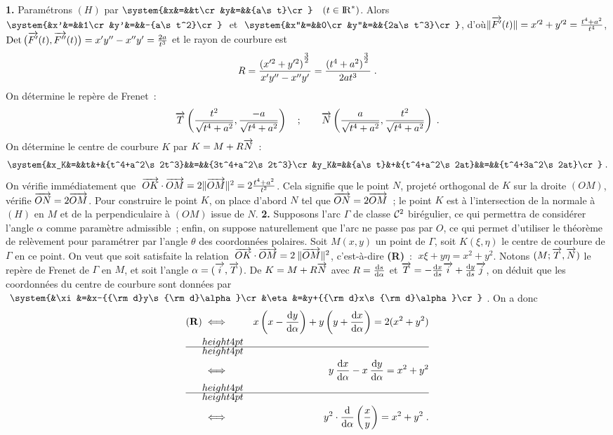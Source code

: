 \documentclass{article}
\begin{document}
{\bf 1.} Param\'etrons $(H)$ par $\system{&x&=&&t\cr &y&=&&{a\s t}\cr}\;$ $\;(t\in{\rm I\kern-0.6mm R}^*)$.
Alors $\system{&x'&=&&1\cr &y'&=&&-{a\s t^2}\cr}\;$ et $\;\system{&x''&=&&0\cr
&y''&=&&{2a\s t^3}\cr}$, d'o\`u\break\noi $\|\vect{F'}(t)\|=x'^2+y'^2={t^4+a^2\s t^4}$,
$\Det\big(\vect{F'}(t),\vect{F''}(t)\big)=x'y''-x''y'={2a\s t^3}$ et le rayon
de courbure est
$$R={(x'^2+y'^2)^{{}^{\sst3\sur\sst2}}\s x'y''-x''y'}={(t^4+a^2)^{{}^{\sst3\sur\sst2}}\s
  2at^3}\;.$$
On d\'etermine le rep\`ere de Frenet~:\vv
$$\vect{T}\lp{t^2\s\sqrt{t^4+a^2}},{-a\s\sqrt{t^4+a^2}}\rp\quad;\qquad
  \vect{N}\lp{a\s\sqrt{t^4+a^2}},{t^2\s\sqrt{t^4+a^2}}\rp\;.$$
On d\'etermine le centre de courbure $K$ par $K=M+R\vect{N}$~:\vv
$$\system{&x_K&=&&t&+&{t^4+a^2\s2t^3}&&=&&{3t^4+a^2\s2t^3}\cr
          &y_K&=&&{a\s t}&+&{t^4+a^2\s2at}&&=&&{t^4+3a^2\s2at}\cr}\;.$$
On v\'erifie imm\'ediatement que $\;\vect{OK}\cdot\vect{OM}=2\|\vect{OM}\|^2=
2{t^4+a^2\s t^2}$. Cela signifie que le point $N$, projet\'e orthogonal de $K$
sur la droite $(OM)$, v\'erifie $\vect{ON}=2\vect{OM}$.\ssk\sect
Pour construire le point $K$, on place d'abord $N$ tel que $\vect{ON}=
2\vect{OM}$~; le point $K$ est \`a l'intersection de la normale \`a $(H)$ en $M$
et de la perpendiculaire \`a $(OM)$ issue de $N$.
\msk
{\bf 2.} Supposons l'arc $\Gamma$ de classe ${\cal C}^2$ bir\'egulier, ce qui permettra de consid\'erer l'angle $\alpha$ comme param\`etre admissible~; enfin, on suppose naturellement que l'arc ne passe pas par $O$, ce qui permet d'utiliser le th\'eor\`eme de rel\`evement pour param\'etrer par l'angle $\theta$ des coordonn\'ees polaires.\msk\sect
Soit $M(x,y)$ un point de $\Gamma$, soit $K(\xi,\eta)$ le centre de courbure de $\Gamma$ en ce point. On veut que soit satisfaite la relation $\;\vect{OK}\cdot\vect{OM}=2\>\|\vect{OM}\|^2$, c'est-\`a-dire {\bf (R)}~: $\;x\xi+y\eta=x^2+y^2$.\msk\sect
Notons $(M;\vect{T},\vect{N})$ le rep\`ere de Frenet de $\Gamma$ en $M$, et soit l'angle $\alpha=(\vect{i},\vect{T})$. De $K=M+R\vect{N}$ avec $R={{\rm d}s\over{\rm d}\alpha}$ et $\vect{T}=-{{\rm d}x\s{\rm d}s}\vect{i}+{{\rm d}y\s{\rm d}s}\vect{j}$, on d\'eduit que les coordonn\'ees du centre de courbure sont donn\'ees par $\;\system{&\xi&=&x-{{\rm d}y\s{\rm d}\alpha}\cr &\eta&=&y+{{\rm d}x\s{\rm d}\alpha}\cr}\;$. On a donc
\begin{eqnarray*}
{\bf (R)} & \iff & x \lp x-{{\rm d}y\s{\rm d}\alpha}\rp+y\lp y+{{\rm d}x\s{\rm d}\alpha}\rp=2(x^2+y^2)\\
& \iff & y\>{{\rm d}x\s{\rm d}\alpha}-x\>{{\rm d}y\s{\rm d}\alpha}=x^2+y^2\\
& \iff & y^2\cdot {{\rm d}\s{\rm d}\alpha}\lp{x\s y}\rp=x^2+y^2\;.
\end{eqnarray*}
\end{document}
